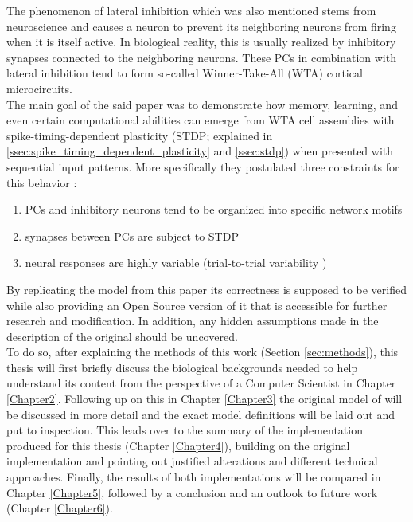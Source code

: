 The phenomenon of lateral inhibition which was also mentioned stems from neuroscience and causes a neuron to prevent its neighboring neurons from firing when it is itself active. In biological reality, this is usually realized by inhibitory synapses connected to the neighboring neurons. These PCs in combination with lateral inhibition tend to form so-called Winner-Take-All (WTA) cortical microcircuits.\\
The main goal of the said paper was to demonstrate how memory, learning, and even certain computational abilities can emerge from WTA cell assemblies with spike-timing-dependent plasticity (STDP; explained in \ref{ssec:spike_timing_dependent_plasticity} and \ref{ssec:stdp}) when presented with sequential input patterns. More specifically they postulated three constraints for this behavior \parencite{klampfl_maass_2013}:
\begin{enumerate}
    \item PCs and inhibitory neurons tend to be organized into specific network motifs
    \item synapses between PCs are subject to STDP
    \item neural responses are highly variable (\glqq trial-to-trial variability \grqq)
\end{enumerate}
By replicating the model from this paper its correctness is supposed to be verified while also providing an Open Source version of it that is accessible for further research and modification. In addition, any hidden assumptions made in the description of the original should be uncovered.\\
To do so, after explaining the methods of this work (Section \ref{sec:methods}), this thesis will first briefly discuss the biological backgrounds needed to help understand its content from the perspective of a Computer Scientist in Chapter \ref{Chapter2}. Following up on this in Chapter \ref{Chapter3} the original model of \parencite{klampfl_maass_2013} will be discussed in more detail and the exact model definitions will be laid out and put to inspection. This leads over to the summary of the implementation produced for this thesis (Chapter \ref{Chapter4}), building on the original implementation and pointing out justified alterations and different technical approaches. Finally, the results of both implementations will be compared in Chapter \ref{Chapter5}, followed by a conclusion and an outlook to future work (Chapter \ref{Chapter6}).


